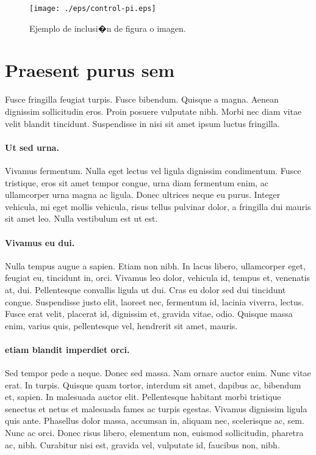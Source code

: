 \begin{figure}[h]
	\centering
	\texttt{[image: ./eps/control-pi.eps]}
	\caption[Ejemplo de inclusi�n de figura o imagen]{
		Ejemplo de inclusi�n de figura o imagen.
	}
	\label{ejemplo_referencia_a_figura_020}
\end{figure}



%
%
\section[Praesent purus sem]{
	Praesent purus sem
}

Fusce fringilla feugiat turpis. Fusce bibendum. Quisque a magna. Aenean dignissim sollicitudin eros. Proin posuere vulputate nibh. Morbi nec diam vitae velit blandit tincidunt. Suspendisse in nisi sit amet ipsum luctus fringilla.


\paragraph*{Ut sed urna.}
Vivamus fermentum. Nulla eget lectus vel ligula dignissim condimentum. Fusce tristique, eros sit amet tempor congue, urna diam fermentum enim, ac ullamcorper urna magna ac ligula. Donec ultrices neque eu purus. Integer vehicula, mi eget mollis vehicula, risus tellus pulvinar dolor, a fringilla dui mauris sit amet leo. Nulla vestibulum est ut est. 

\paragraph*{Vivamus eu dui.}
Nulla tempus augue a sapien. Etiam non nibh. In lacus libero, ullamcorper eget, feugiat eu, tincidunt in, orci. Vivamus leo dolor, vehicula id, tempus et, venenatis at, dui. Pellentesque convallis ligula ut dui. Cras eu dolor sed dui tincidunt congue. Suspendisse justo elit, laoreet nec, fermentum id, lacinia viverra, lectus. Fusce erat velit, placerat id, dignissim et, gravida vitae, odio. Quisque massa enim, varius quis, pellentesque vel, hendrerit sit amet, mauris.

\paragraph*{etiam blandit imperdiet orci.}
Sed tempor pede a neque. Donec sed massa. Nam ornare auctor enim. Nunc vitae erat. In turpis. Quisque quam tortor, interdum sit amet, dapibus ac, bibendum et, sapien. In malesuada auctor elit. Pellentesque habitant morbi tristique senectus et netus et malesuada fames ac turpis egestas. Vivamus dignissim ligula quis ante. Phasellus dolor massa, accumsan in, aliquam nec, scelerisque ac, sem. Nunc ac orci. Donec risus libero, elementum non, euismod sollicitudin, pharetra ac, nibh. Curabitur nisi est, gravida vel, vulputate id, faucibus non, nibh.


